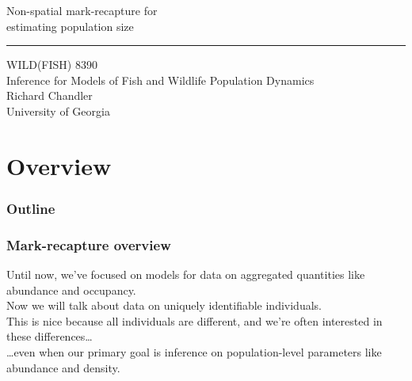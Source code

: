 \documentclass[color=usenames,dvipsnames]{beamer}\usepackage[]{graphicx}\usepackage[]{xcolor}
\begin{document}
\begin{frame}[plain]
  \LARGE
  \centering
  {
    \LARGE %
    Non-spatial mark-recapture for \\ estimating
    population size%
  }
  {\color{default} \rule{\textwidth}{0.1pt} }
  \vfill
  \large
  WILD(FISH) 8390 \\
  Inference for Models of Fish and Wildlife Population Dynamics \\
  \vfill
  \large
  Richard Chandler \\
  University of Georgia \\
\end{frame}






\section{Overview}



\begin{frame}[plain]
  \frametitle{Outline}
  \Large
\end{frame}



\begin{frame}
  \frametitle{Mark-recapture overview}
  Until now, we've focused on models for data on aggregated quantities
  like abundance and occupancy. \\ 
  \pause
  \vfill
  Now we will talk about data on uniquely identifiable individuals. \\
  \pause
  \vfill
  This is nice because all individuals are different, and we're often
  interested in these differences\dots \\
  \pause
  \vfill
  \dots even when our primary goal is
  inference on population-level parameters like abundance
  and density. \\
\end{frame}
\end{document}
